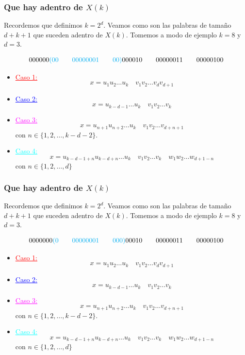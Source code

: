 \documentclass[10pt,mathserif]{beamer}%
\begin{document}
\begin{frame}
  \frametitle{Que hay adentro de $X(k)$}
  Recordemos que definimos $k = 2^d$.
  Veamos como son las palabras de tamaño $d + k + 1$ que suceden adentro de $X(k)$. Tomemos a modo de ejemplo $k = 8$ y $d = 3$.

  $$000000\textcolor{cyan}{(00 \qquad 00000001 \qquad 00)}  000010 \qquad 00000011 \qquad 00000100$$

    \begin{itemize}
    \item \textcolor{red}{\underline{Caso 1:}}
    $$x = u_1 u_2 \dots u_k \quad v_1 v_2 \dots v_{d} v_{d + 1}$$  
    \item \textcolor{blue}{\underline{Caso 2:}}
    $$ x = u_{k-d-1} \dots u_k \quad v_1 v_2 \dots v_k$$
    \item \textcolor{magenta}{\underline{Caso 3:}}
    $$x = u_{n+1} u_{n+2} \dots u_k \quad  v_1 v_2 \dots v_{d+n+1} $$
    con $n \in \{1,2,\dots ,k - d - 2\}$.
    \item \textcolor{cyan}{\underline{Caso 4:}}
    $$ x = u_{k-d-1+n} u_{k-d+n} \dots u_k \quad v_1 v_2 \dots v_k \quad w_1 w_2 \dots w_{d+1-n}$$
    con $n \in \{1, 2, \dots , d\}$
  \end{itemize}
\end{frame}

\begin{frame}
  \frametitle{Que hay adentro de $X(k)$}
  Recordemos que definimos $k = 2^d$.
  Veamos como son las palabras de tamaño $d + k + 1$ que suceden adentro de $X(k)$. Tomemos a modo de ejemplo $k = 8$ y $d = 3$.

  $$0000000\textcolor{cyan}{(0 \qquad 00000001 \qquad 000)}  00010 \qquad 00000011 \qquad 00000100$$

    \begin{itemize}
    \item \textcolor{red}{\underline{Caso 1:}}
    $$x = u_1 u_2 \dots u_k \quad v_1 v_2 \dots v_{d} v_{d + 1}$$  
    \item \textcolor{blue}{\underline{Caso 2:}}
    $$ x = u_{k-d-1} \dots u_k \quad v_1 v_2 \dots v_k$$
    \item \textcolor{magenta}{\underline{Caso 3:}}
    $$x = u_{n+1} u_{n+2} \dots u_k \quad  v_1 v_2 \dots v_{d+n+1} $$
    con $n \in \{1,2,\dots ,k - d - 2\}$.
    \item \textcolor{cyan}{\underline{Caso 4:}}
    $$ x = u_{k-d-1+n} u_{k-d+n} \dots u_k \quad v_1 v_2 \dots v_k \quad w_1 w_2 \dots w_{d+1-n}$$
    con $n \in \{1, 2, \dots , d\}$
  \end{itemize}
\end{frame}
\end{document}
